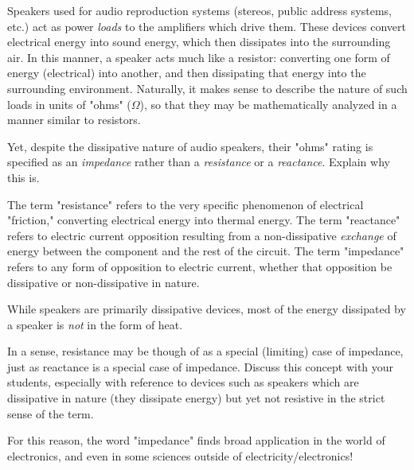 

Speakers used for audio reproduction systems (stereos, public address systems, etc.) act as power {\it loads} to the amplifiers which drive them.  These devices convert electrical energy into sound energy, which then dissipates into the surrounding air.  In this manner, a speaker acts much like a resistor: converting one form of energy (electrical) into another, and then dissipating that energy into the surrounding environment.  Naturally, it makes sense to describe the nature of such loads in units of "ohms" ($\Omega$), so that they may be mathematically analyzed in a manner similar to resistors.

Yet, despite the dissipative nature of audio speakers, their "ohms" rating is specified as an {\it impedance} rather than a {\it resistance} or a {\it reactance}.  Explain why this is.







The term "resistance" refers to the very specific phenomenon of electrical "friction," converting electrical energy into thermal energy.  The term "reactance" refers to electric current opposition resulting from a non-dissipative {\it exchange} of energy between the component and the rest of the circuit.  The term "impedance" refers to any form of opposition to electric current, whether that opposition be dissipative or non-dissipative in nature.

While speakers are primarily dissipative devices, most of the energy dissipated by a speaker is {\it not} in the form of heat.







In a sense, resistance may be though of as a special (limiting) case of impedance, just as reactance is a special case of impedance.  Discuss this concept with your students, especially with reference to devices such as speakers which are dissipative in nature (they dissipate energy) but yet not resistive in the strict sense of the term.

For this reason, the word "impedance" finds broad application in the world of electronics, and even in some sciences outside of electricity/electronics!




